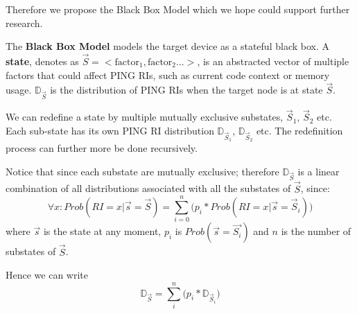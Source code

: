 Therefore we propose the Black Box Model which we hope could support further research.

\begin{definition}
The \textbf{Black Box Model} models the target device as a stateful black box. A \textbf{state}, denotes as $\vec{S}=<\text{factor}_1, \text{factor}_2...>$, is an abstracted vector of multiple factors that could affect PING RIs, such as current code context or memory usage. $\mathbb{D}_{\vec{S}}$ is the distribution of PING RIs when the target node is at state $\vec{S}$.
\end{definition}

We can redefine a state by multiple mutually exclusive substates, $\vec{S}_1$, $\vec{S}_2$ etc. Each sub-state has its own PING RI distribution $\mathbb{D}_{\vec{S}_1}$, $\mathbb{D}_{\vec{S}_2}$ etc. The redefinition process can further more be done recursively.

Notice that since each substate are mutually exclusive; therefore $\mathbb{D}_{\vec{S}}$ is a linear combination of all distributions associated with all the substates of $\vec{S}$, since:
\begin{equation*}
\forall x: Prob(RI = x | \vec{s}=\vec{S}) = \sum_{i=0}^{n}{\big( p_i*Prob(RI = x | \vec{s} = \vec{S}_i)\big)}
\end{equation*}
where $\vec{s}$ is the state at any moment, $p_i$ is $Prob(\vec{s} = \vec{S_i})$ and $n$ is the number of substates of $\vec{S}$.

Hence we can write
\begin{equation} \label{Eq: pD}
\mathbb{D}_{\vec{S}} = \sum_{i}^{n}{\big(p_i * \mathbb{D}_{\vec{S}_i} \big)}
\end{equation}

